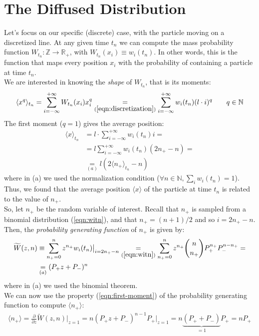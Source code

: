 \documentclass[../template.tex]{subfiles}
\begin{document}
\section{The Diffused Distribution}
Let's focus on our specific (discrete) case, with the particle moving on a discretized line. At any given time $t_n$ we can compute the mass probability function $W_{t_n}\colon \mathbb{Z} \to \mathbb{R}_+$, with $W_{t_n}(x_i) \equiv w_i(t_n)$. In other words, this is the function that maps every position $x_i$ with the probability of containing a particle at time $t_n$.\\
We are interested in knowing the \textit{shape} of $W_{t_n}$, that is its moments:  
\begin{align*}
    \langle x^q \rangle_{t_n} = \sum_{i=-\infty}^{+\infty} W_{t_n}(x_i) x_i^q \underset{(\ref{eqn:discretization})}{=}  \sum_{i=-\infty}^{+\infty} w_i(t_n)  (l\cdot i)^q \qquad q \in \mathbb{N}
\end{align*}
The first moment ($q=1$) gives the average position:
\begin{align}\nonumber
    \langle x \rangle_{t_n} &= l \cdot \sum_{i=-\infty}^{+\infty} w_i(t_n) i =\\ \nonumber
    &= l \sum_{i=-\infty}^{+\infty} w_i(t_n) (2n_+ - n) =\\
    & \underset{(a)}{=}  l\left(2\langle n_+ \rangle_{t_n} - n\right)
    \label{eqn:x-nplus}
\end{align}
where in (a) we used the normalization condition ($\forall n \in \mathbb{N},\sum_i w_i(t_n) = 1$). Thus, we found that
the average position $\langle x \rangle$ of the particle at time $t_n$  is related to the value of $n_+$.\\

So, let $n_+$ be the random variable of interest. Recall that $n_+$ is sampled from a binomial distribution (\ref{eqn:witn}), and that $n_+ = (n+1)/2$ and so $i = 2n_+ - n$.\\
Then, the \textit{probability generating function} of $n_+$ is given by:   
\begin{align*}
    \widetilde{W} (z,n) &\equiv \sum_{n_+=0}^{n} z^{n_+} w_i(t_n)\big |_{i = 2n_+ -n} \underset{(\ref{eqn:witn})}{=}  \sum_{n_+=0}^{n} z^{n_+} {n\choose n_+} P_+^{n_+} P_-^{n-n_+} =\\
    & \underset{(a)}{=} (P_+ z + P_-)^n
\end{align*}
where in (a) we used the binomial theorem.\\

We can now use the property (\ref{eqn:first-moment}) of the probability generating function to compute $\langle n_+ \rangle$: 
\begin{align}
    \langle n_+ \rangle = \frac{\partial}{\partial z}\widetilde{W}(z,n) \Big|_{z=1} = n(P_+ z + P_-)^{n-1} P_+ \Big|_{z=1} = n\underbrace{(P_+ + P_-)}_{=1} P_+ = nP_+
    \label{eqn:nplus-mean}
\end{align} 
\end{document}
